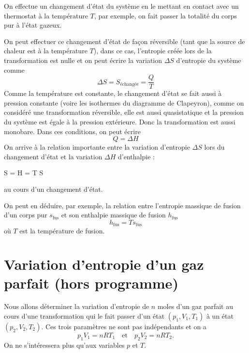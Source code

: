 \documentclass{cours}
\begin{document}
On effectue un changement d'état du système en le mettant en contact avec un thermostat à la température $T$, par exemple, on fait passer la totalité du corps pur à l'état gazeux.

On peut effectuer ce changement d'état de façon réversible (tant que la source de chaleur est à la température $T$), dans ce cas, l'entropie créée lors de la transformation est nulle et on peut écrire la variation $\Delta S$ d'entropie du système comme
\begin{equation}
  \Delta S = S_\text{échangée} =\frac{Q}{T}
\end{equation}
Comme la température est constante, le changement d'état se fait aussi à pression constante (voire les isothermes du diagramme de Clapeyron), comme on considéré une transformation réversible, elle est aussi quasistatique et la pression du système est égale à la pression extérieure. Donc la transformation est aussi monobare. Dans ces conditions, on peut écrire
\begin{equation}
  Q = \Delta H
\end{equation}
On arrive à la relation importante entre la variation d'entropie $\Delta S$ lors du changement d'état et la variation $\Delta H$ d'enthalpie :
\begin{eqencadre}
  \Delta S =  \quad {}\quad \Delta H = T \Delta S
\end{eqencadre}
au cours d'un changement d'état.

On peut en déduire, par exemple, la relation entre l'entropie massique de fusion d'un corps pur $s_\text{fus}$ et son enthalpie massique de fusion $h_\text{fus}$ 
\begin{equation}
  h_\text{fus} = T s_\text{fus}
\end{equation}
où $T$ est la température de fusion.


\section{Variation d'entropie d'un gaz parfait (hors programme)}%
\label{sec:variation_d_entropie_d_un_gaz_parfait}

Nous allons déterminer la variation d'entropie de $n$ moles d'un gaz parfait au cours d'une transformation qui le fait passer d'un état $(p_1, V_1, T_1)$ à un état $(p_2, V_2, T_2)$. Ces trois paramètres ne sont pas indépendants et on a 
\begin{equation}
  p_1V_1 = nRT_1 \quad \text{et}\quad p_2V_2 =nRT_2.
\end{equation}
On ne s'intéressera plus qu'aux variables $p$ et $T$. 
\end{document}
